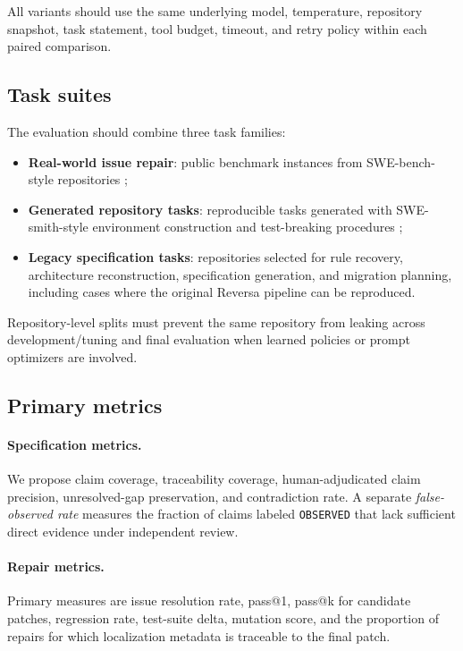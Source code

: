 All variants should use the same underlying model, temperature, repository snapshot, task statement, tool budget, timeout, and retry policy within each paired comparison.

\subsection{Task suites}

The evaluation should combine three task families:

\begin{itemize}
  \item \textbf{Real-world issue repair}: public benchmark instances from SWE-bench-style repositories \cite{jimenez2024swebench};
  \item \textbf{Generated repository tasks}: reproducible tasks generated with SWE-smith-style environment construction and test-breaking procedures \cite{yang2025swesmith};
  \item \textbf{Legacy specification tasks}: repositories selected for rule recovery, architecture reconstruction, specification generation, and migration planning, including cases where the original Reversa pipeline can be reproduced.
\end{itemize}

Repository-level splits must prevent the same repository from leaking across development/tuning and final evaluation when learned policies or prompt optimizers are involved.

\subsection{Primary metrics}

\paragraph{Specification metrics.}
We propose claim coverage, traceability coverage, human-adjudicated claim precision, unresolved-gap preservation, and contradiction rate. A separate \emph{false-observed rate} measures the fraction of claims labeled \texttt{OBSERVED} that lack sufficient direct evidence under independent review.

\paragraph{Repair metrics.}
Primary measures are issue resolution rate, pass@1, pass@k for candidate patches, regression rate, test-suite delta, mutation score, and the proportion of repairs for which localization metadata is traceable to the final patch.

